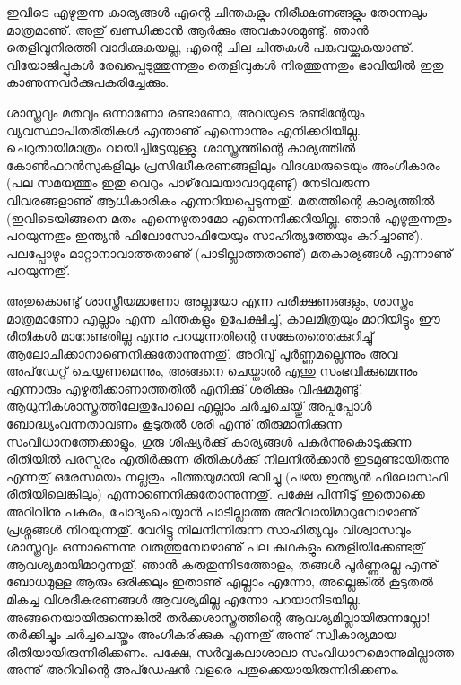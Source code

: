 ﻿
\vskip 2pt

ഇവിടെ എഴുതുന്ന കാര്യങ്ങള്‍ എന്റെ ചിന്തകളും നിരീക്ഷണങ്ങളും തോന്നലും മാത്രമാണു്. അതു് ഖണ്ഡിക്കാന്‍ ആര്‍ക്കും 
അവകാശമുണ്ടു്. ഞാന്‍ തെളിവുനിരത്തി വാദിക്കുകയല്ല, എന്റെ ചില ചിന്തകള്‍ പങ്കുവയ്ക്കുകയാണു്. വിയോജിപ്പുകള്‍ 
രേഖപ്പെടുത്തുന്നതും തെളിവുകള്‍ നിരത്തുന്നതും ഭാവിയില്‍ ഇതു കാണുന്നവര്‍ക്കുപകരിച്ചേക്കും.

ശാസ്ത്രവും മതവും ഒന്നാണോ രണ്ടാണോ, അവയുടെ രണ്ടിന്റേയും വ്യവസ്ഥാപിതരീതികള്‍ എന്താണു് എന്നൊന്നും 
എനിക്കറിയില്ല. ചെറുതായിമാത്രം വായിച്ചിട്ടേയുള്ളു. ശാസ്ത്രത്തിന്റെ കാര്യത്തില്‍ കോണ്‍ഫറന്‍സുകളിലും 
പ്രസിദ്ധീകരണങ്ങളിലും വിദഗ്ദ്ധരുടെയും അംഗീകാരം (പല സമയത്തും ഇതു വെറും പാഴ്‌വേലയാവാറുമുണ്ടു്) നേടിവരുന്ന 
വിവരങ്ങളാണു് ആധികാരികം എന്നറിയപ്പെടുന്നതു്. മതത്തിന്റെ കാര്യത്തില്‍ (ഇവിടെയിങ്ങനെ മതം എന്നെഴുതാമോ 
എന്നെനിക്കറിയില്ല. ഞാന്‍ എഴുതുന്നതും പറയുന്നതും ഇന്ത്യന്‍ ഫിലോസോഫിയേയും സാഹിത്യത്തേയും കുറിച്ചാണു്). 
പലപ്പോഴും മാറ്റാനാവാത്തതാണു് (പാടില്ലാത്തതാണു്) മതകാര്യങ്ങള്‍ എന്നാണു് പറയുന്നതു്.

അതുകൊണ്ടു് ശാസ്ത്രീയമാണോ അല്ലയോ എന്ന പരീക്ഷണങ്ങളും, ശാസ്ത്രം മാത്രമാണോ എല്ലാം എന്ന ചിന്തകളും ഉപേക്ഷിച്ചു്, 
കാലമിത്രയും മാറിയിട്ടും ഈ രീതികള്‍ മാറേണ്ടതില്ല എന്നു പറയുന്നതിന്റെ സങ്കേതത്തെക്കുറിച്ചു് 
ആലോചിക്കാനാണെനിക്കുതോന്നുന്നതു്. അറിവു് പൂര്‍ണ്ണമല്ലെന്നും അവ അപ്‌ഡേറ്റ് ചെയ്യണമെന്നും, അങ്ങനെ ചെയ്താല്‍ എന്തു 
സംഭവിക്കുമെന്നും എന്നാരും എഴുതിക്കാണാത്തതില്‍ എനിക്കു് ശരിക്കും വിഷമമുണ്ടു്. ആധുനികശാസ്ത്രത്തിലേതുപോലെ 
എല്ലാം ചര്‍ച്ചചെയ്തു് അപ്പപ്പോള്‍ ബോദ്ധ്യംവന്നതാവണം കൂടുതല്‍ ശരി എന്നു് തീരുമാനിക്കുന്ന സംവിധാനത്തേക്കാളും, 
ഗുരു ശിഷ്യര്‍ക്കു് കാര്യങ്ങള്‍ പകര്‍ന്നുകൊടുക്കുന്ന രീതിയില്‍ പരസ്പരം എതിര്‍ക്കുന്ന രീതികള്‍ക്കു് നിലനില്‍ക്കാന്‍ 
ഇടമുണ്ടായിരുന്നു എന്നതു് ഒരേസമയം നല്ലതും ചീത്തയുമായി ഭവിച്ചു (പഴയ ഇന്ത്യന്‍ ഫിലോസഫി രീതിയിലെങ്കിലും) 
എന്നാണെനിക്കുതോന്നുന്നതു്. പക്ഷേ പിന്നീടു് ഇതൊക്കെ അറിവിനു പകരം, ചോദ്യംചെയ്യാന്‍ പാടില്ലാത്ത അറിവായിമാറുമ്പോഴാണു് 
പ്രശ്നങ്ങള്‍ നിറയുന്നതു്. വേറിട്ടു നിലനിന്നിരുന്ന സാഹിത്യവും വിശ്വാസവും ശാസ്ത്രവും ഒന്നാണെന്നു വരുത്തുമ്പോഴാണു് 
പല കഥകളും തെളിയിക്കേണ്ടതു് ആവശ്യമായിമാറുന്നതു്. ഞാന്‍ കരുതുന്നിടത്തോളം, തങ്ങള്‍ പൂര്‍ണ്ണരല്ല എന്നു് ബോധമുള്ള 
ആരും ഒരിക്കലും ഇതാണു് എല്ലാം എന്നോ, അല്ലെങ്കില്‍ കൂടുതല്‍ മികച്ച വിശദീകരണങ്ങള്‍ ആവശ്യമില്ല എന്നോ പറയാനിടയില്ല. 
അങ്ങനെയായിരുന്നെങ്കില്‍ തര്‍ക്കശാസ്ത്രത്തിന്റെ ആവശ്യമില്ലായിരുന്നല്ലോ! തര്‍ക്കിച്ചും ചര്‍ച്ചചെയ്തും അംഗീകരിക്കുക 
എന്നതു് അന്നു് സ്വീകാര്യമായ രീതിയായിരുന്നിരിക്കണം. പക്ഷേ, സര്‍വ്വകലാശാലാ സംവിധാനമൊന്നുമില്ലാത്ത അന്നു് അറിവിന്റെ
അപ്ഡേഷന്‍ വളരെ പതുക്കെയായിരുന്നിരിക്കണം.

